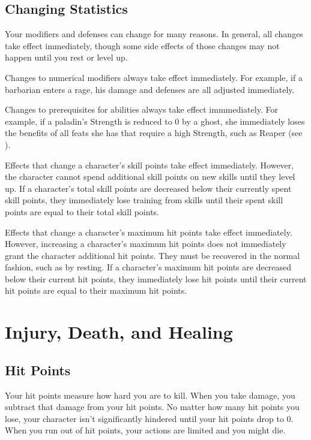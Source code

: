    \subsection{Changing Statistics}

        Your modifiers and defenses can change for many reasons.
        In general, all changes take effect immediately, though some side effects of those changes may not happen until you rest or level up.

         Changes to numerical modifiers always take effect immediately.
        For example, if a barbarian enters a rage, his damage and defenses are all adjusted immediately.

         Changes to prerequisites for abilities always take effect immmediately.
        For example, if a paladin's Strength is reduced to 0 by a ghost, she immediately loses the benefits of all feats she has that require a high Strength, such as Reaper (see ).

         Effects that change a character's skill points take effect immediately.
        However, the character cannot spend additional skill points on new skills until they level up.
        If a character's total skill points are decreased below their currently spent skill points, they immediately lose training from skills until their spent skill points are equal to their total skill points.

         Effects that change a character's maximum hit points take effect immediately.
        However, increasing a character's maximum hit points does not immediately grant the character additional hit points.
        They must be recovered in the normal fashion, such as by resting.
        If a character's maximum hit points are decreased below their current hit points, they immediately lose hit points until their current hit points are equal to their maximum hit points.

\section{Injury, Death, and Healing}\label{Injury, Death, and Healing}

    \subsection{Hit Points}\label{Hit Points}
        Your hit points measure how hard you are to kill.
        When you take damage, you subtract that damage from your hit points.
        No matter how many hit points you lose, your character isn't significantly hindered until your hit points drop to 0.
        When you run out of hit points, your actions are limited and you might die.

